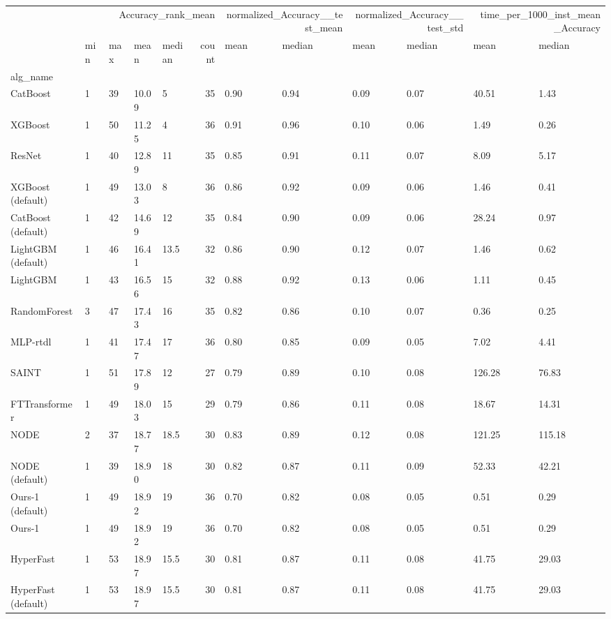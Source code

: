 \begin{tabular}{lllllrllllll}
\toprule
 & \multicolumn{5}{r}{Accuracy_rank_mean} & \multicolumn{2}{r}{normalized_Accuracy__test_mean} & \multicolumn{2}{r}{normalized_Accuracy__test_std} & \multicolumn{2}{r}{time_per_1000_inst_mean_Accuracy} \\
 & min & max & mean & median & count & mean & median & mean & median & mean & median \\
alg_name &  &  &  &  &  &  &  &  &  &  &  \\
\midrule
CatBoost & 1 & 39 & 10.09 & 5 & 35 & 0.90 & 0.94 & 0.09 & 0.07 & 40.51 & 1.43 \\
XGBoost & 1 & 50 & 11.25 & 4 & 36 & 0.91 & 0.96 & 0.10 & 0.06 & 1.49 & 0.26 \\
ResNet & 1 & 40 & 12.89 & 11 & 35 & 0.85 & 0.91 & 0.11 & 0.07 & 8.09 & 5.17 \\
XGBoost (default) & 1 & 49 & 13.03 & 8 & 36 & 0.86 & 0.92 & 0.09 & 0.06 & 1.46 & 0.41 \\
CatBoost (default) & 1 & 42 & 14.69 & 12 & 35 & 0.84 & 0.90 & 0.09 & 0.06 & 28.24 & 0.97 \\
LightGBM (default) & 1 & 46 & 16.41 & 13.5 & 32 & 0.86 & 0.90 & 0.12 & 0.07 & 1.46 & 0.62 \\
LightGBM & 1 & 43 & 16.56 & 15 & 32 & 0.88 & 0.92 & 0.13 & 0.06 & 1.11 & 0.45 \\
RandomForest & 3 & 47 & 17.43 & 16 & 35 & 0.82 & 0.86 & 0.10 & 0.07 & 0.36 & 0.25 \\
MLP-rtdl & 1 & 41 & 17.47 & 17 & 36 & 0.80 & 0.85 & 0.09 & 0.05 & 7.02 & 4.41 \\
SAINT & 1 & 51 & 17.89 & 12 & 27 & 0.79 & 0.89 & 0.10 & 0.08 & 126.28 & 76.83 \\
FTTransformer & 1 & 49 & 18.03 & 15 & 29 & 0.79 & 0.86 & 0.11 & 0.08 & 18.67 & 14.31 \\
NODE & 2 & 37 & 18.77 & 18.5 & 30 & 0.83 & 0.89 & 0.12 & 0.08 & 121.25 & 115.18 \\
NODE (default) & 1 & 39 & 18.90 & 18 & 30 & 0.82 & 0.87 & 0.11 & 0.09 & 52.33 & 42.21 \\
Ours-1 (default) & 1 & 49 & 18.92 & 19 & 36 & 0.70 & 0.82 & 0.08 & 0.05 & 0.51 & 0.29 \\
Ours-1 & 1 & 49 & 18.92 & 19 & 36 & 0.70 & 0.82 & 0.08 & 0.05 & 0.51 & 0.29 \\
HyperFast & 1 & 53 & 18.97 & 15.5 & 30 & 0.81 & 0.87 & 0.11 & 0.08 & 41.75 & 29.03 \\
HyperFast (default) & 1 & 53 & 18.97 & 15.5 & 30 & 0.81 & 0.87 & 0.11 & 0.08 & 41.75 & 29.03 \\

\end{tabular}
